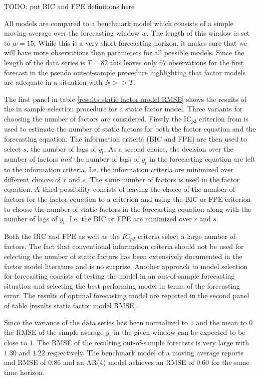 \documentclass[11pt]{article}
\begin{document}
TODO: put BIC and FPE definitions here

All models are compared to a benchmark model which consists of a simple moving average over the forecasting window $w$. The length of this window is set to $w=15$. While this is a very short forecasting horizon, it makes sure that we will have more observations than parameters for all possible models. Since the length of the data series is $T=82$ this leaves only $67$ observations for the first forecast in the pseudo out-of-sample procedure highlighting that factor models are adequate in a situation with $N>>T$.

The first panel in table \ref{results static factor model RMSE} shows the results of the in sample selection procedure for a static factor model. Three variants for choosing the number of factors are considered. Firstly the IC$_{p2}$ criterion from \citet{bai2002determining} is used to estimate the number of static factors for both the factor equation and the forecasting equation. The information criteria (BIC and FPE) are then used to select $s$, the number of lags of $y_t$.
As a second choice, the decision over the number of factors \textit{and} the number of lags of $y_t$ in the forecasting equation are left to the information criteria. I.e. the information criteria are minimized over different choices of $r$ and $s$. The same number of factors is used in the factor equation.
A third possibility consists of leaving the choice of the number of factors for the factor equation to a \citet{bai2002determining} criterion and using the BIC or FPE criterion to choose the number of static factors in the forecasting equation along with the number of lags of $y_t$. I.e. the BIC or FPE are minimized over $r$ and $s$.

Both the BIC and FPE as well as the $IC_{p2}$ criteria select a large number of factors. The fact that conventional information criteria should not be used for selecting the number of static factors has been extensively documented in the factor model literature and is no surprise. Another approach to model selection for forecasting consists of testing the model in an out-of-sample forecasting situation and selecting the best performing model in terms of the forecasting error. The results of optimal forecasting model are reported in the second panel of table \ref{results static factor model RMSE}.

Since the variance of the data series has been normalized to $1$ and the mean to $0$ the RMSE of the simple average $y_t$ in the given window can be expected to be close to $1$. The RMSE of the resulting out-of-sample forecasts is very large with $1.30$ and $1.22$ respectively. The benchmark model of a moving average reports and RMSE of $0.86$ and an AR(4) model achieves an RMSE of $0.60$ for the same time horizon.
\end{document}
